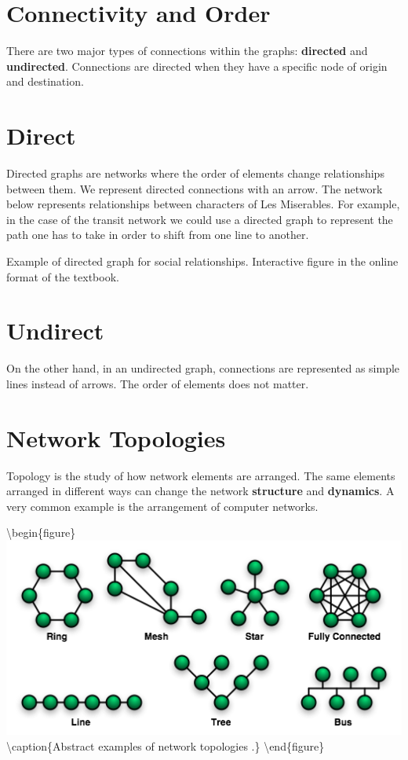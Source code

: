 \documentclass[
]{book}
\begin{document}
\hypertarget{connectivity-and-order}{%
\section{Connectivity and Order}\label{connectivity-and-order}}

There are two major types of connections within the graphs: \textbf{directed} and \textbf{undirected}. Connections are directed when they have a specific node of origin and destination.

\hypertarget{direct}{%
\section{Direct}\label{direct}}

Directed graphs are networks where the order of elements change relationships between them. We represent directed connections with an arrow. The network below represents relationships between characters of Les Miserables. For example, in the case of the transit network we could use a directed graph to represent the path one has to take in order to shift from one line to another.

\label{fig:8-directed-graph}Example of directed graph for social relationships. Interactive figure in the online format of the textbook.

\hypertarget{undirect}{%
\section{Undirect}\label{undirect}}

On the other hand, in an undirected graph, connections are represented as simple lines instead of arrows. The order of elements does not matter.

\hypertarget{network-topologies}{%
\section{Network Topologies}\label{network-topologies}}

Topology is the study of how network elements are arranged. The same elements arranged in different ways can change the network \textbf{structure} and \textbf{dynamics}. A very common example is the arrangement of computer networks.

\textbackslash begin\{figure\}
\includegraphics[width=0.8\linewidth]{images/08-network_topologies} \textbackslash caption\{Abstract examples of network topologies \citep{wikibooks_communication_2018}.\}\label{fig:8-network-topologies}
\textbackslash end\{figure\}
\end{document}

